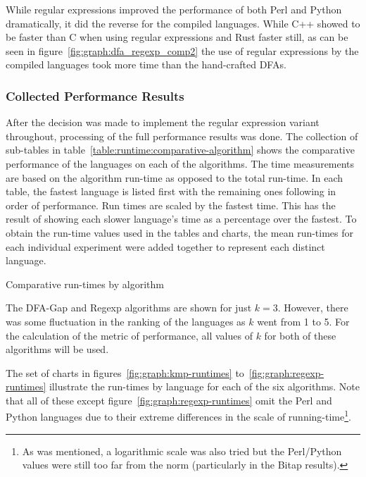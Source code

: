 While regular expressions improved the performance of both Perl and Python dramatically, it did the reverse for the compiled languages. While C++ showed to be faster than C when using regular expressions and Rust faster still, as can be seen in figure~\ref{fig:graph:dfa_regexp_comp2} the use of regular expressions by the compiled languages took more time than the hand-crafted DFAs.

\subsubsection{Collected Performance Results}

After the decision was made to implement the regular expression variant throughout, processing of the full performance results was done. The collection of sub-tables in table~\ref{table:runtime:comparative-algorithm} shows the comparative performance of the languages on each of the algorithms. The time measurements are based on the algorithm run-time as opposed to the total run-time. In each table, the fastest language is listed first with the remaining ones following in order of performance. Run times are scaled by the fastest time. This has the result of showing each slower language's time as a percentage over the fastest. To obtain the run-time values used in the tables and charts, the mean run-times for each individual experiment were added together to represent each distinct language.

\begin{table}[!htb]

\caption{Comparative run-times by algorithm}
\label{table:runtime:comparative-algorithm}
\end{table}

The DFA-Gap and Regexp algorithms are shown for just $k=3$. However, there was some fluctuation in the ranking of the languages as $k$ went from 1 to 5. For the calculation of the metric of performance, all values of $k$ for both of these algorithms will be used.

The set of charts in figures~\ref{fig:graph:kmp-runtimes} to~\ref{fig:graph:regexp-runtimes} illustrate the run-times by language for each of the six algorithms. Note that all of these except figure~\ref{fig:graph:regexp-runtimes} omit the Perl and Python languages due to their extreme differences in the scale of running-time\footnote{As was mentioned, a logarithmic scale was also tried but the Perl/Python values were still too far from the norm (particularly in the Bitap results).}.

